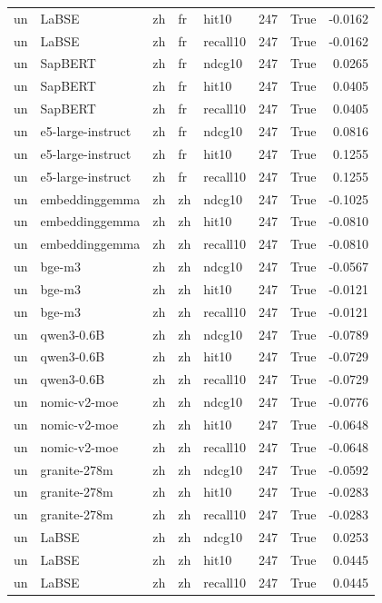 \begin{tabular}{lllllrrr}
un & LaBSE & zh & fr & hit10 & 247 & True & -0.0162 \\
un & LaBSE & zh & fr & recall10 & 247 & True & -0.0162 \\
un & SapBERT & zh & fr & ndcg10 & 247 & True & 0.0265 \\
un & SapBERT & zh & fr & hit10 & 247 & True & 0.0405 \\
un & SapBERT & zh & fr & recall10 & 247 & True & 0.0405 \\
un & e5-large-instruct & zh & fr & ndcg10 & 247 & True & 0.0816 \\
un & e5-large-instruct & zh & fr & hit10 & 247 & True & 0.1255 \\
un & e5-large-instruct & zh & fr & recall10 & 247 & True & 0.1255 \\
un & embeddinggemma & zh & zh & ndcg10 & 247 & True & -0.1025 \\
un & embeddinggemma & zh & zh & hit10 & 247 & True & -0.0810 \\
un & embeddinggemma & zh & zh & recall10 & 247 & True & -0.0810 \\
un & bge-m3 & zh & zh & ndcg10 & 247 & True & -0.0567 \\
un & bge-m3 & zh & zh & hit10 & 247 & True & -0.0121 \\
un & bge-m3 & zh & zh & recall10 & 247 & True & -0.0121 \\
un & qwen3-0.6B & zh & zh & ndcg10 & 247 & True & -0.0789 \\
un & qwen3-0.6B & zh & zh & hit10 & 247 & True & -0.0729 \\
un & qwen3-0.6B & zh & zh & recall10 & 247 & True & -0.0729 \\
un & nomic-v2-moe & zh & zh & ndcg10 & 247 & True & -0.0776 \\
un & nomic-v2-moe & zh & zh & hit10 & 247 & True & -0.0648 \\
un & nomic-v2-moe & zh & zh & recall10 & 247 & True & -0.0648 \\
un & granite-278m & zh & zh & ndcg10 & 247 & True & -0.0592 \\
un & granite-278m & zh & zh & hit10 & 247 & True & -0.0283 \\
un & granite-278m & zh & zh & recall10 & 247 & True & -0.0283 \\
un & LaBSE & zh & zh & ndcg10 & 247 & True & 0.0253 \\
un & LaBSE & zh & zh & hit10 & 247 & True & 0.0445 \\
un & LaBSE & zh & zh & recall10 & 247 & True & 0.0445 \\

\end{tabular}
